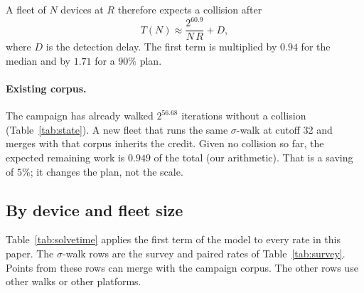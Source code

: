 A fleet of $N$ devices at $R$ therefore expects a collision after
\[
  T(N) \approx \frac{2^{60.9}}{N\,R} + D,
\]
where $D$ is the detection delay. The first term is multiplied by $0.94$
for the median and by $1.71$ for a $90\%$ plan.

\paragraph{Existing corpus.} The campaign has already walked $2^{56.68}$
iterations without a collision (Table~\ref{tab:state}). A new fleet
that runs the same $\sigma$-walk at cutoff 32 and merges with that
corpus inherits the credit. Given no collision so far, the expected
remaining work is $0.949$ of the total (our arithmetic). That is a
saving of $5\%$; it changes the plan, not the scale.

\subsection{By device and fleet size}
\label{sec:solvetime-table}

Table~\ref{tab:solvetime} applies the first term of the model to every
rate in this paper. The $\sigma$-walk rows are the survey and paired
rates of Table~\ref{tab:survey}. Points from these rows can merge with
the campaign corpus. The other rows use other walks or other platforms.

